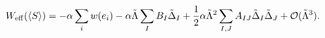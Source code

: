 \begin{equation}
W_{{\rm {eff}}}(\langle S\rangle )=-\alpha \sum_{i}w(e_{i})-\alpha \tilde{%
\Lambda}\sum_{I}B_{I}\tilde{\Delta}_{I}+\frac{1}{2}\alpha \tilde{\Lambda}%
^{2}\sum_{I,J}A_{IJ}\tilde{\Delta}_{I}\tilde{\Delta}_{J}+{\cal O}(\tilde{%
\Lambda}^{3}).  \label{Weff}
\end{equation}

